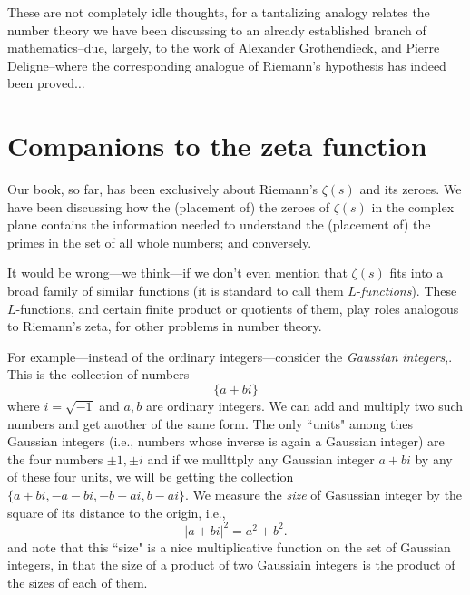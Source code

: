 \documentclass[openany]{book}
\theoremstyle{plain}
\theoremstyle{definition}
\begin{document}
These are not completely idle thoughts, for a tantalizing analogy
relates the number theory we have been discussing to an already
established branch of mathematics--due, largely, to the work of
Alexander Grothendieck, and Pierre Deligne--where the corresponding
analogue of Riemann's hypothesis has indeed been proved$\dots$



\chapter{Companions to the zeta function}
 
Our book, so far, has been exclusively about Riemann's $\zeta(s)$ and
its zeroes. We have been discussing how the (placement of) the zeroes
of $\zeta(s)$ in the complex plane contains the information needed to
understand the (placement of) the primes in the set of all whole
numbers; and conversely.
  
It would be wrong---we think---if we don't even mention that
$\zeta(s)$ fits into a broad family of similar functions (it is
standard to call them $L$-{\it functions}).  These $L$-functions, and
certain finite product or quotients of them, play roles analogous to
Riemann's zeta, for other problems in number theory.
  

   
For example---instead of the ordinary integers---consider 
the  {\it Gaussian integers},. This is the collection of numbers
 $$ \{ a+bi\}$$ where $i = {\sqrt{-1}}$ and $a,b$ are ordinary integers. We can add and multiply two such numbers and get another of the same form. The only ``units" among thes Gaussian integers (i.e., numbers whose inverse is again a Gaussian integer) are the four numbers $\pm 1, \pm i$  and if we mullttply any Gaussian integer $a+bi$ by any of these four units, we will be getting  the collection $\{a+bi, -a-bi, -b+ai, b -ai\}$.  We measure the {\it size} of  Gasussian integer by the square of its distance to the origin, i.e., $$|a+bi|^2 =  {a^2+b^2}.$$ and note that this ``size" is a nice multiplicative function on the set of Gaussian integers, in that the size of a product of two Gaussiain integers is the product of the sizes of each of them.   
 
\end{document}
